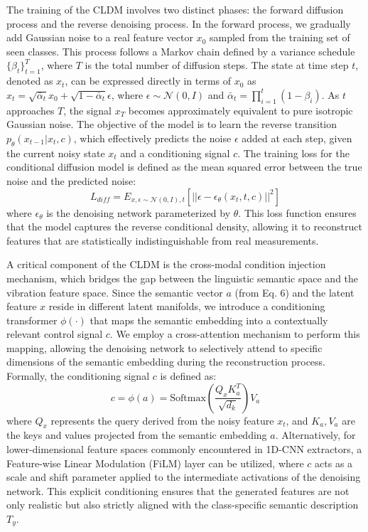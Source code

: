 \documentclass[journal]{IEEEtran}
\begin{document}
The training of the CLDM involves two distinct phases: the forward diffusion process and the reverse denoising process. In the forward process, we gradually add Gaussian noise to a real feature vector $x_0$ sampled from the training set of seen classes. This process follows a Markov chain defined by a variance schedule $\{\beta_t\}_{t=1}^T$, where $T$ is the total number of diffusion steps. The state at time step $t$, denoted as $x_t$, can be expressed directly in terms of $x_0$ as $x_t = \sqrt{\bar{\alpha}_t} x_0 + \sqrt{1 - \bar{\alpha}_t} \epsilon$, where $\epsilon \sim \mathcal{N}(0, I)$ and $\bar{\alpha}_t = \prod_{i=1}^t (1 - \beta_i)$. As $t$ approaches $T$, the signal $x_T$ becomes approximately equivalent to pure isotropic Gaussian noise. The objective of the model is to learn the reverse transition $p_\theta(x_{t-1}|x_t, c)$, which effectively predicts the noise $\epsilon$ added at each step, given the current noisy state $x_t$ and a conditioning signal $c$. The training loss for the conditional diffusion model is defined as the mean squared error between the true noise and the predicted noise:
\begin{equation}
L_{diff} = E_{x, \epsilon \sim \mathcal{N}(0,I), t} \left[ ||\epsilon - \epsilon_\theta(x_t, t, c)||^2 \right]
\end{equation}
where $\epsilon_\theta$ is the denoising network parameterized by $\theta$. This loss function ensures that the model captures the reverse conditional density, allowing it to reconstruct features that are statistically indistinguishable from real measurements.

A critical component of the CLDM is the cross-modal condition injection mechanism, which bridges the gap between the linguistic semantic space and the vibration feature space. Since the semantic vector $a$ (from Eq. 6) and the latent feature $x$ reside in different latent manifolds, we introduce a conditioning transformer $\phi(\cdot)$ that maps the semantic embedding into a contextually relevant control signal $c$. We employ a cross-attention mechanism to perform this mapping, allowing the denoising network to selectively attend to specific dimensions of the semantic embedding during the reconstruction process. Formally, the conditioning signal $c$ is defined as:
\begin{equation}
c = \phi(a) = \text{Softmax}\left(\frac{Q_x K_a^T}{\sqrt{d_k}}\right) V_a
\end{equation}
where $Q_x$ represents the query derived from the noisy feature $x_t$, and $K_a, V_a$ are the keys and values projected from the semantic embedding $a$. Alternatively, for lower-dimensional feature spaces commonly encountered in 1D-CNN extractors, a Feature-wise Linear Modulation (FiLM) layer can be utilized, where $c$ acts as a scale and shift parameter applied to the intermediate activations of the denoising network. This explicit conditioning ensures that the generated features are not only realistic but also strictly aligned with the class-specific semantic description $T_y$.
\end{document}
